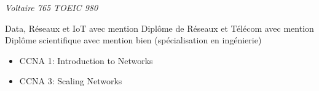 \documentclass[10pt,a4paper,ragged2e,withhyper]{altacv}
\begin{document}
\begin{paracol}{2}
\switchcolumn
\newpage

\textit{Voltaire 765}
\smallbreak
{}
\textit{TOEIC 980}
\smallbreak
{}
\smallbreak
{}
\smallbreak
{}

Data, Réseaux et IoT avec mention
\smallbreak
\divider
{}
Diplôme de Réseaux et Télécom avec mention
\smallbreak
\divider
{}
Diplôme scientifique avec mention bien (spécialisation en ingénierie)

\begin{itemize}
  \item CCNA 1: Introduction to Networks
  \item CCNA 3: Scaling Networks
\end{itemize}

\end{paracol}
\end{document}

